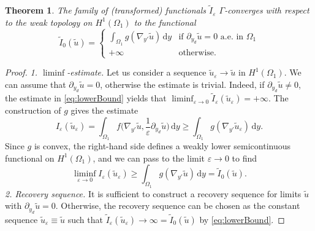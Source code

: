\documentclass[a4paper,12pt]{article}
\newcommand{\eps}{\varepsilon}
\newcommand{\dd}{\,\mathrm{d}}
\newcommand{\wt}{\widetilde}
\newtheorem{theorem}{Theorem}[section]
\begin{document}
\setcounter{theorem}{10}
 \begin{theorem}The family of (transformed) functionals $\wt I_\eps$
 $\Gamma$-converges with respect to the weak topology on $H^1(\Omega_1)$ to the functional
 \[
 \wt I_0 (\wt u ) = \begin{cases}\displaystyle
 \int_{\Omega_1} g(\nabla_{y'} \wt u) \dd y &\text{if }\partial_{y_d}\wt u = 0\text{ a.e.\ in }\Omega_1\\
 +\infty&\text{otherwise}.
 \end{cases}
 \]
 \end{theorem}

\begin{proof} 
\emph{1. $\liminf$-estimate. }Let us consider a sequence 
$\wt u_\eps \to \wt u $ in $H^1(\Omega_1)$. We can assume that 
$\partial_{y_d}\wt u = 0$, otherwise the estimate is trivial. Indeed, if $\partial_{y_d}\wt u \neq 0$, the estimate in \eqref{eq:lowerBound} yields that  $\liminf_{\eps \to 0} \wt I_\eps(\wt u_\eps) = +\infty$. The construction of $g$ gives the estimate
\[
I_\eps(\wt u_\eps)  = \int_{\Omega_1}f\Big(\nabla_{y'}\wt u,\frac{1}{\eps}\partial_{y_d}\wt u\Big)\dd y \geq  \int_{\Omega_1} g(\nabla_{y'} \wt u_\eps)\dd y.
\]
Since $g$ is convex, the right-hand side defines a weakly lower semicontinuous functional on $H^1(\Omega_1)$, and we can pass to the limit $\eps\to 0$ to find
\[
\liminf_{\eps\to 0 }I_\eps(\wt u_\eps) \geq  \int_{\Omega_1} g(\nabla_{y'} \wt u)\dd y = \wt I_0(\wt u).
\]
\emph{2. Recovery sequence. }It is sufficient to construct a recovery sequence for limits $\wt u$ with $\partial_{y_d} \wt u = 0$.
Otherwise, the recovery sequence can be chosen as the constant sequence $\wt u _\eps \equiv  \wt u$ such that $\wt I_{\eps} (\wt u_\eps) \to \infty = \wt I_0(\wt u)$ by \eqref{eq:lowerBound}.


\end{proof}
\end{document}
